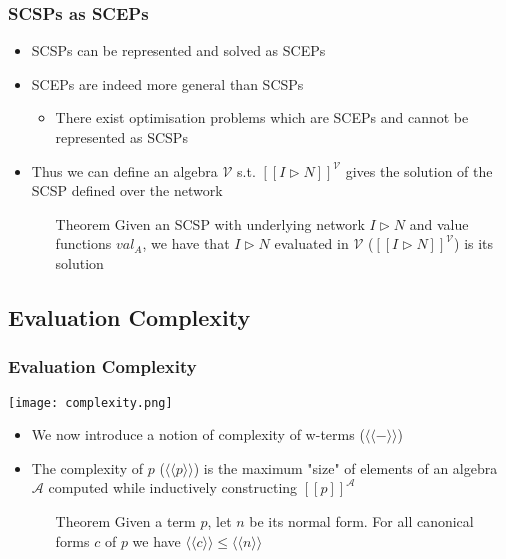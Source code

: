 \documentclass{beamer}
\begin{document}
\begin{frame}
\frametitle{SCSPs as SCEPs}
\begin{itemize}
	\item SCSPs can be represented and solved as SCEPs
\medskip
	\item SCEPs are indeed more general than SCSPs
	\begin{itemize}
		\item There exist optimisation problems which are SCEPs and cannot be represented
		as SCSPs
	\end{itemize}
\medskip
	\item Thus we can define an algebra $\mathcal{V}$ s.t. 
	$[\![ I \triangleright N ]\!]^{\mathcal{V}}$ gives the solution of the SCSP defined
	over the network
\medskip
	\begin{itemize}
		\item[Theorem] Given an SCSP with underlying network $I \triangleright N$ and
		value functions $val_A$, we have that $I \triangleright N$ evaluated in $\mathcal{V}$
		($[\![ I \triangleright N ]\!]^{\mathcal{V}}$) is its solution
	\end{itemize}
\end{itemize}
\end{frame}

\subsection{Evaluation Complexity}

\begin{frame}
\frametitle{Evaluation Complexity}
\begin{center}
	\texttt{[image: complexity.png]}      
\end{center}
\begin{itemize}
	\item We now introduce a notion of complexity of w-terms ($\langle \langle - \rangle \rangle$)
\medskip
	\item The complexity of $p$ ($\langle \langle p \rangle \rangle$) is the maximum "size" of
	elements of an algebra $\mathcal{A}$ computed while inductively constructing 
	$[\![ p ]\!]^{\mathcal{A}}$
\medskip
	\begin{itemize}
		\item[Theorem] Given a term $p$, let $n$ be its normal form. For all canonical
		forms $c$ of $p$ we have $\langle \langle c \rangle \rangle \leq \langle \langle n
		\rangle \rangle$
	\end{itemize}
\end{itemize}
\medskip

\end{frame}
\end{document}
